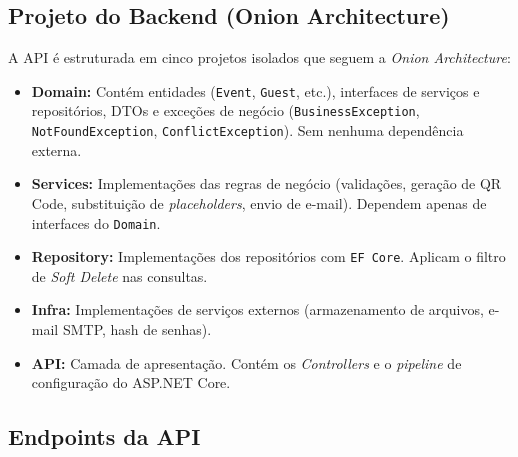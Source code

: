 \subsection{Projeto do Backend (Onion Architecture)}

A API é estruturada em cinco projetos isolados que seguem a \textit{Onion Architecture}:

\begin{itemize}
    \item \textbf{Domain:} Contém entidades (\texttt{Event}, \texttt{Guest}, etc.), interfaces de serviços e repositórios, DTOs e exceções de negócio (\texttt{BusinessException}, \texttt{NotFoundException}, \texttt{ConflictException}). Sem nenhuma dependência externa.
    \item \textbf{Services:} Implementações das regras de negócio (validações, geração de QR Code, substituição de \textit{placeholders}, envio de e-mail). Dependem apenas de interfaces do \texttt{Domain}.
    \item \textbf{Repository:} Implementações dos repositórios com \texttt{EF Core}. Aplicam o filtro de \textit{Soft Delete} nas consultas.
    \item \textbf{Infra:} Implementações de serviços externos (armazenamento de arquivos, e-mail SMTP, hash de senhas).
    \item \textbf{API:} Camada de apresentação. Contém os \textit{Controllers} e o \textit{pipeline} de configuração do ASP.NET Core.
\end{itemize}

\subsection{Endpoints da API}

